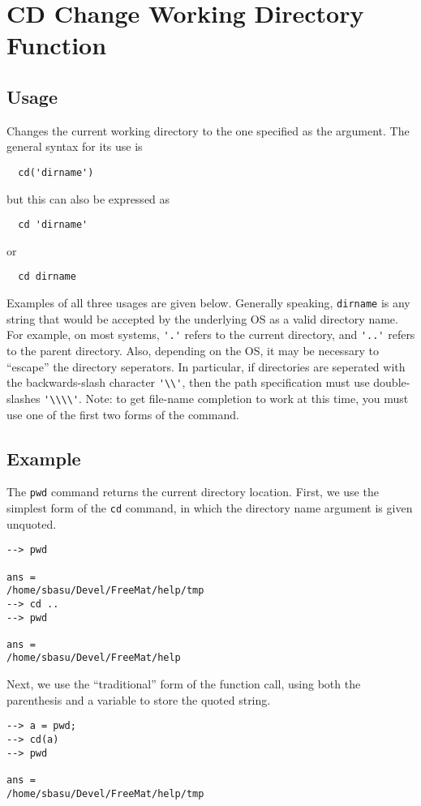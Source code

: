 \section{CD Change Working Directory Function}

\subsection{Usage}

Changes the current working directory to the one specified as the argument.  The general syntax for its use is
\begin{verbatim}
  cd('dirname')
\end{verbatim}
but this can also be expressed as
\begin{verbatim}
  cd 'dirname'
\end{verbatim}
or 
\begin{verbatim}
  cd dirname
\end{verbatim}
Examples of all three usages are given below.
Generally speaking, \verb|dirname| is any string that would be accepted 
by the underlying OS as a valid directory name.  For example, on most 
systems, \verb|'.'| refers to the current directory, and \verb|'..'| refers 
to the parent directory.  Also, depending on the OS, it may be necessary 
to ``escape'' the directory seperators.  In particular, if directories 
are seperated with the backwards-slash character \verb|'\\'|, then the 
path specification must use double-slashes \verb|'\\\\'|. Note: to get 
file-name completion to work at this time, you must use one of the 
first two forms of the command.

\subsection{Example}

The \verb|pwd| command returns the current directory location.  First, 
we use the simplest form of the \verb|cd| command, in which the directory 
name argument is given unquoted.
\begin{verbatim}
--> pwd

ans = 
/home/sbasu/Devel/FreeMat/help/tmp
--> cd ..
--> pwd

ans = 
/home/sbasu/Devel/FreeMat/help
\end{verbatim}
Next, we use the ``traditional'' form of the function call, using 
both the parenthesis and a variable to store the quoted string.
\begin{verbatim}
--> a = pwd;
--> cd(a)
--> pwd

ans = 
/home/sbasu/Devel/FreeMat/help/tmp
\end{verbatim}
